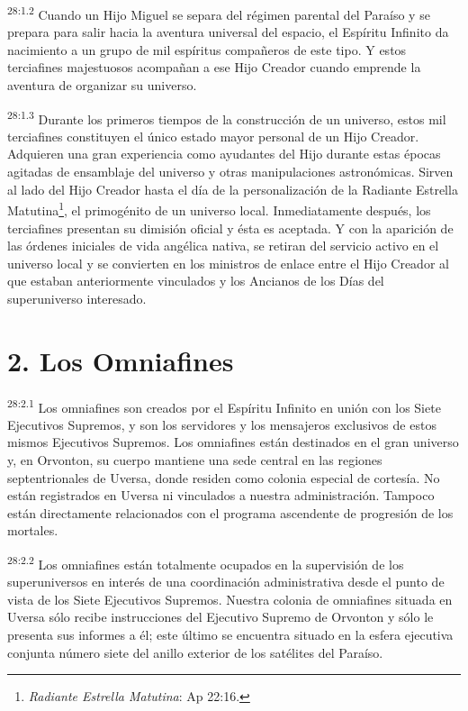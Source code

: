 \par
\textsuperscript{28:1.2} Cuando un Hijo Miguel se separa del régimen parental del Paraíso y se prepara para salir hacia la aventura universal del espacio, el Espíritu Infinito da nacimiento a un grupo de mil espíritus compañeros de este tipo. Y estos terciafines majestuosos acompañan a ese Hijo Creador cuando emprende la aventura de organizar su universo.

\par
\textsuperscript{28:1.3} Durante los primeros tiempos de la construcción de un universo, estos mil terciafines constituyen el único estado mayor personal de un Hijo Creador. Adquieren una gran experiencia como ayudantes del Hijo durante estas épocas agitadas de ensamblaje del universo y otras manipulaciones astronómicas. Sirven al lado del Hijo Creador hasta el día de la personalización de la Radiante Estrella Matutina\footnote{\textit{Radiante Estrella Matutina}: Ap 22:16.}, el primogénito de un universo local. Inmediatamente después, los terciafines presentan su dimisión oficial y ésta es aceptada. Y con la aparición de las órdenes iniciales de vida angélica nativa, se retiran del servicio activo en el universo local y se convierten en los ministros de enlace entre el Hijo Creador al que estaban anteriormente vinculados y los Ancianos de los Días del superuniverso interesado.

\section*{2. Los Omniafines}
\par
\textsuperscript{28:2.1} Los omniafines son creados por el Espíritu Infinito en unión con los Siete Ejecutivos Supremos, y son los servidores y los mensajeros exclusivos de estos mismos Ejecutivos Supremos. Los omniafines están destinados en el gran universo y, en Orvonton, su cuerpo mantiene una sede central en las regiones septentrionales de Uversa, donde residen como colonia especial de cortesía. No están registrados en Uversa ni vinculados a nuestra administración. Tampoco están directamente relacionados con el programa ascendente de progresión de los mortales.

\par
\textsuperscript{28:2.2} Los omniafines están totalmente ocupados en la supervisión de los superuniversos en interés de una coordinación administrativa desde el punto de vista de los Siete Ejecutivos Supremos. Nuestra colonia de omniafines situada en Uversa sólo recibe instrucciones del Ejecutivo Supremo de Orvonton y sólo le presenta sus informes a él; este último se encuentra situado en la esfera ejecutiva conjunta número siete del anillo exterior de los satélites del Paraíso.

